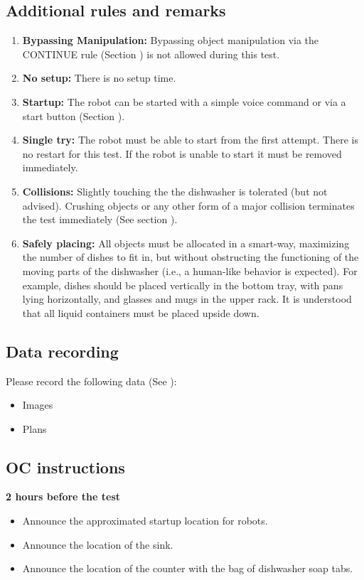 \subsection{Additional rules and remarks}
\begin{enumerate}
	\item \textbf{Bypassing Manipulation:} Bypassing object manipulation via the CONTINUE rule (Section ) is not allowed during this test.
	\item \textbf{No setup:} There is no setup time.
	\item \textbf{Startup:} The robot can be started with a simple voice command or via a start button (Section ). 
	\item \textbf{Single try:} The robot must be able to start from the first attempt. There is no restart for this test. If the robot is unable to start it must be removed immediately.
	\item \textbf{Collisions:} Slightly touching the the dishwasher is tolerated (but not advised). Crushing objects or any other form of a major collision terminates the test immediately (See section ).
	\item \textbf{Safely placing:} All objects must be allocated in a smart-way, maximizing the number of dishes to fit in, but without obstructing the functioning of the moving parts of the dishwasher (i.e., a human-like behavior is expected). For example, dishes should be placed vertically in the bottom tray, with pans lying horizontally, and glasses and mugs in the upper rack. It is understood that all liquid containers must be placed upside down.
\end{enumerate}

\subsection{Data recording}
Please record the following data (See ):
\begin{itemize}
	\item Images
	\item Plans
\end{itemize}

\subsection{OC instructions}

\textbf{2 hours before the test}
\begin{itemize}
    \item Announce the approximated startup location for robots.
    \item Announce the location of the sink.
    \item Announce the location of the counter with the bag of dishwasher soap tabs.
\end{itemize}

